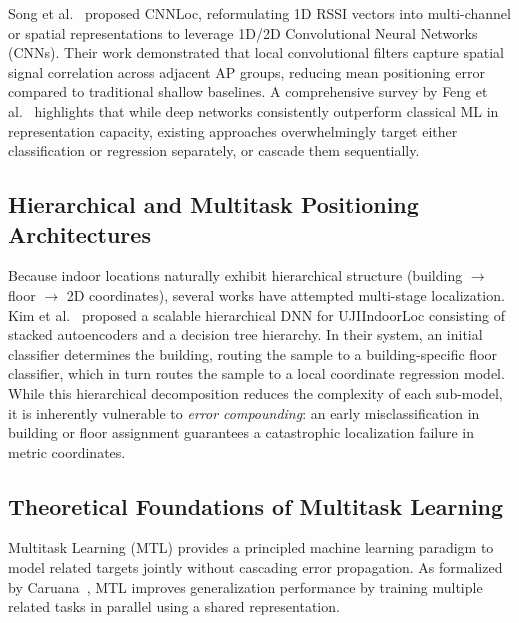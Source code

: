 Song et al.~\cite{song2019cnnloc} proposed CNNLoc, reformulating 1D RSSI vectors into multi-channel or spatial representations to leverage 1D/2D Convolutional Neural Networks (CNNs). Their work demonstrated that local convolutional filters capture spatial signal correlation across adjacent AP groups, reducing mean positioning error compared to traditional shallow baselines. A comprehensive survey by Feng et al.~\cite{feng2022survey} highlights that while deep networks consistently outperform classical ML in representation capacity, existing approaches overwhelmingly target either classification or regression separately, or cascade them sequentially.

\subsection{Hierarchical and Multitask Positioning Architectures}
Because indoor locations naturally exhibit hierarchical structure (building $\to$ floor $\to$ 2D coordinates), several works have attempted multi-stage localization. Kim et al.~\cite{kim2018scalable} proposed a scalable hierarchical DNN for UJIIndoorLoc consisting of stacked autoencoders and a decision tree hierarchy. In their system, an initial classifier determines the building, routing the sample to a building-specific floor classifier, which in turn routes the sample to a local coordinate regression model. While this hierarchical decomposition reduces the complexity of each sub-model, it is inherently vulnerable to \emph{error compounding}: an early misclassification in building or floor assignment guarantees a catastrophic localization failure in metric coordinates.

\subsection{Theoretical Foundations of Multitask Learning}
Multitask Learning (MTL) provides a principled machine learning paradigm to model related targets jointly without cascading error propagation. As formalized by Caruana~\cite{caruana1997multitask}, MTL improves generalization performance by training multiple related tasks in parallel using a shared representation.

